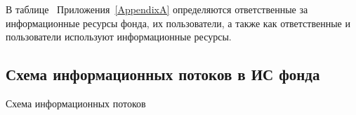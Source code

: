 \point В таблице~ Приложения~\ref{AppendixA} определяются ответственные за информационные ресурсы фонда, их пользователи, а также как ответственные и пользователи используют информационные ресурсы.

\subsection{Схема информационных потоков в ИС фонда}

Схема информационных потоков


